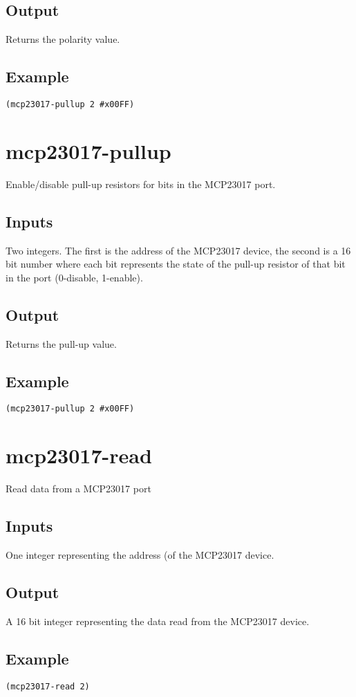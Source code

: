 \documentclass[10pt, openany]{book}
\begin{document}
\subsection{Output}
Returns the polarity value.
\subsection{Example}
\begin{lstlisting}
(mcp23017-pullup 2 #x00FF)
\end{lstlisting}

\section{mcp23017-pullup}
Enable/disable pull-up resistors for bits in the MCP23017 port.
\subsection{Inputs}
Two integers.  The first is the address of the MCP23017 device, the second is a 16 bit number where each bit represents the state of the pull-up resistor of that bit in the port (0-disable, 1-enable).
\subsection{Output}
Returns the pull-up value.
\subsection{Example}
\begin{lstlisting}
(mcp23017-pullup 2 #x00FF)
\end{lstlisting}

\section{mcp23017-read}
Read data from a MCP23017 port
\subsection{Inputs}
One integer representing the address (of the MCP23017 device.
\subsection{Output}
A 16 bit integer representing the data read from the MCP23017 device.
\subsection{Example}
\begin{lstlisting}
(mcp23017-read 2)
\end{lstlisting}
\end{document}
